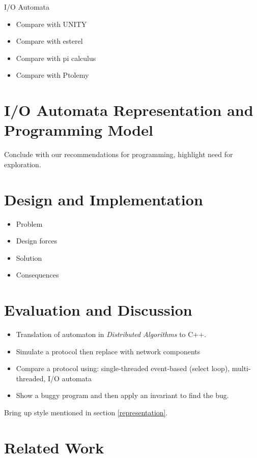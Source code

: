 \documentclass[letterpaper]{article}
\begin{document}
I/O Automata
\begin{itemize}
  \item Compare with UNITY
  \item Compare with esterel
  \item Compare with pi calculus
  \item Compare with Ptolemy
\end{itemize}

\section{I/O Automata Representation and Programming Model\label{representation}}

Conclude with our recommendations for programming, highlight need for exploration.

\section{Design and Implementation\label{design}}

\begin{itemize}
  \item Problem
  \item Design forces
  \item Solution
  \item Consequences
\end{itemize}

\section{Evaluation and Discussion\label{evaluation}}

\begin{itemize}
\item Translation of automaton in \emph{Distributed Algorithms} to C++.
\item Simulate a protocol then replace with network components
\item Compare a protocol using: single-threaded event-based (select loop), multi-threaded, I/O automata
\item Show a buggy program and then apply an invariant to find the bug.
\end{itemize}

Bring up style mentioned in section \ref{representation}.

\section{Related Work\label{related_work}}
\end{document}

